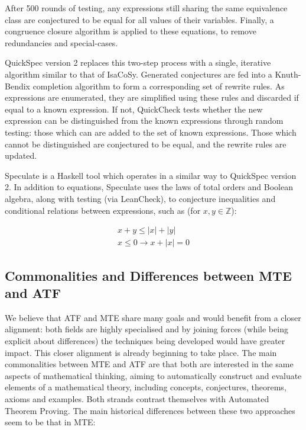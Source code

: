 After 500 rounds of testing, any expressions still sharing the same equivalence
class are conjectured to be equal for all values of their variables. Finally, a
congruence closure algorithm is applied to these equations, to remove
redundancies and special-cases.

QuickSpec version 2 replaces this two-step process with a single, iterative
algorithm similar to that of IsaCoSy. Generated conjectures are fed into a
Knuth-Bendix completion algorithm to form a corresponding set of rewrite rules.
As expressions are enumerated, they are simplified using these rules and
discarded if equal to a known expression. If not, QuickCheck tests whether the
new expression can be distinguished from the known expressions through random
testing: those which can are added to the set of known expressions. Those which
cannot be distinguished are conjectured to be equal, and the rewrite rules are
updated.

Speculate is a Haskell tool which operates in a similar way to QuickSpec
version 2. In addition to equations, Speculate uses the laws of total orders and
Boolean algebra, along with testing (via LeanCheck), to conjecture inequalities
and conditional relations between expressions, such as (for
$x, y \in \mathbb{Z}$):

\begin{equation*}
  \begin{aligned}
    x + y \leq \lvert x \rvert + \lvert y \rvert \\
    x \leq 0 \rightarrow x + \lvert x \rvert = 0
  \end{aligned}
\end{equation*}

\subsection{Commonalities and Differences between MTE and ATF}

We believe that ATF and MTE share many goals and would benefit from a
closer alignment: both fields are highly specialised and by joining
forces (while being explicit about differences) the techniques being
developed would have greater impact. This closer alignment is already
beginning to take place. The main commonalities between MTE and ATF
are that both are interested in the same aspects of mathematical
thinking, aiming to automatically construct and evaluate elements of a
mathematical theory, including concepts, conjectures, theorems, axioms
and examples. Both strands contrast themselves with Automated Theorem
Proving. The main historical differences between these two approaches
seem to be that in MTE:

